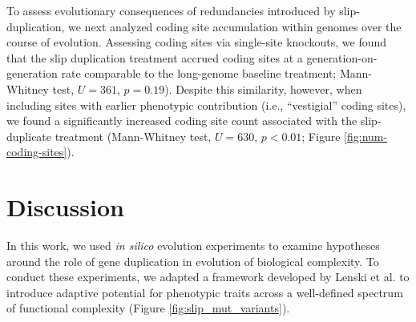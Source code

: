 To assess evolutionary consequences of redundancies introduced by slip-duplication, we next analyzed coding site accumulation within genomes over the course of evolution.
Assessing coding sites via single-site knockouts, we found that the slip duplication treatment accrued coding sites at a generation-on-generation rate comparable to the long-genome baseline treatment; Mann-Whitney test, $U=361$, $p=0.19$).
Despite this similarity, however, when including sites with earlier phenotypic contribution (i.e., ``vestigial'' coding sites), we found a significantly increased coding site count associated with the slip-duplicate treatment (Mann-Whitney test, $U=630$, $p<0.01$; Figure \ref{fig:num-coding-sites}).




\section{Discussion} \label{sec:discussion}

In this work, we used \textit{in silico} evolution experiments to examine hypotheses around the role of gene duplication in evolution of biological complexity.
To conduct these experiments, we adapted a framework developed by Lenski et al. \citep{Lenski2003Evolutionary} to introduce adaptive potential for phenotypic traits across a well-defined spectrum of functional complexity (Figure \ref{fig:slip_mut_variants}).

